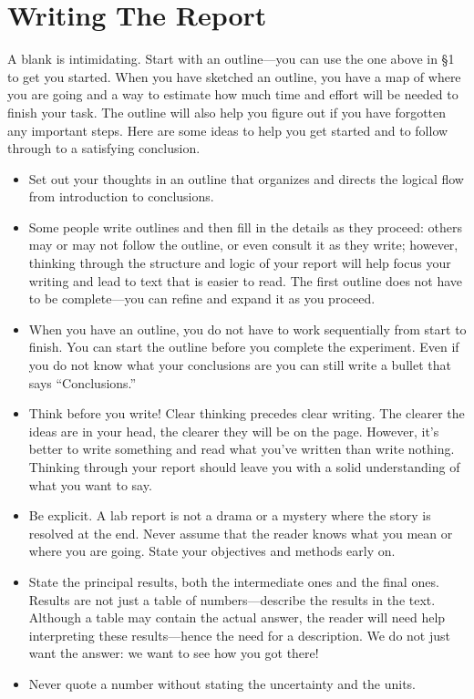 \documentclass[12pt,preprint]{aastex}
\begin{document}
\section{Writing The Report}

\noindent
A blank is intimidating. Start with an outline---you can use the one above in \S1 to get you started. When you have sketched an outline, you have a map of where you are going and a way to estimate how much time and effort will be needed to finish your task. The outline will also help you figure out if you have forgotten any important steps. Here are some ideas to help you get started and to follow through to a satisfying conclusion.
\begin{itemize}
\item Set out your thoughts in an outline that organizes and directs the logical flow from introduction to conclusions. 
\item Some people write outlines and then fill in the details as they proceed: others may or may not follow the outline, or even consult it as they write; however, thinking through the structure and logic of your report will help focus your writing and lead to text that is easier to read. The first outline does not have to be complete—you can refine and expand it as you proceed. 
\item When you have an outline, you do not have to work sequentially from start to finish. You can start the outline before you complete the experiment. Even if you do not know what your conclusions are you can still write a bullet that says “Conclusions.”
\item Think before you write! Clear thinking precedes clear writing. The clearer the ideas are in your head, the clearer they will be on the page. However, it’s better to write something and read what you’ve written than write nothing. Thinking through your report should leave you with a solid understanding of what you want to say.
\item Be explicit. A lab report is not a drama or a mystery where the story is resolved at the end. Never assume that the reader knows what you mean or where you are going. State your objectives and methods early on. 
\item State the principal results, both the intermediate ones and the final ones. Results are not just a table of numbers—describe the results in the text. Although a table may contain the actual answer, the reader will need help interpreting these results—hence the need for a description. We do not just want the answer: we want to see how you got there! 
\item Never quote a number without stating the uncertainty and the units.

\end{itemize}
\end{document}
